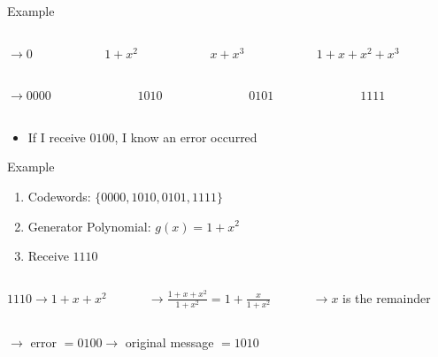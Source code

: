 \documentclass[aspectratio=169]{beamer}
\begin{document}
\begin{frame}{Example}
    \begin{columns}[c]
    \begin{column}{3cm}
        $\to 0$
    \end{column}
    \begin{column}{3cm}
        $1 + x^2$
    \end{column}
    \begin{column}{3cm}
        $x + x^3$
    \end{column}
    \begin{column}{3cm}
        $1 + x + x^2 + x^3$
    \end{column}
    \hfill
    \end{columns} \pause

    \begin{columns}[c]
    \begin{column}{3cm}
        $\to 0000$
    \end{column}
    \begin{column}{3cm}
        $1010$
    \end{column}
    \begin{column}{3cm}
        $0101$
    \end{column}
    \begin{column}{3cm}
        $1111$
    \end{column}
    \hfill
    \end{columns} \pause

    \bigskip

    \begin{itemize}
        \item If I receive $0100$, I know an error occurred
    \end{itemize}
\end{frame}

\begin{frame}{Example}
    \begin{enumerate}
    \item Codewords: $\{0000, 1010, 0101, 1111\}$
    \item Generator Polynomial: $g(x) = 1 + x^2$
    \item Receive $1110$ \pause
    \end{enumerate}

    \bigskip

    \begin{columns}[c]
    \begin{column}{4cm}
        $1110 \to 1 + x + x^2$
    \end{column} \pause
    \begin{column}{4cm}
        $\to \frac{1 + x + x^2}{1 + x^2} = 1 + \frac x {1 + x^2}$
    \end{column}
    \begin{column}{4cm}
        $\to x$ is the remainder
    \end{column}
    \hfill
    \end{columns} \pause

    $\to \text{ error } = 0100 \to$ original message $= 1010$
\end{frame}
\end{document}

